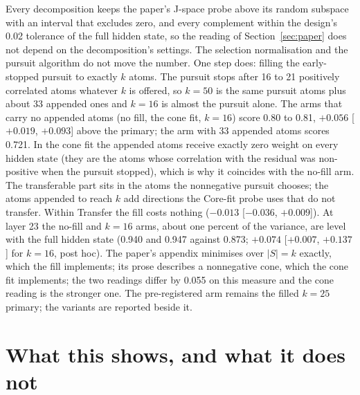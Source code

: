 \documentclass[11pt,a4paper]{article}
\begin{document}
Every decomposition keeps the paper's J-space probe above its random subspace with an interval that excludes zero, and every complement within the design's 0.02 tolerance of the full hidden state, so the reading of Section~\ref{sec:paper} does not depend on the decomposition's settings. The selection normalisation and the pursuit algorithm do not move the number. One step does: filling the early-stopped pursuit to exactly $k$ atoms. The pursuit stops after 16 to 21 positively correlated atoms whatever $k$ is offered, so $k=50$ is the same pursuit atoms plus about 33 appended ones and $k=16$ is almost the pursuit alone. The arms that carry no appended atoms (no fill, the cone fit, $k=16$) score 0.80 to 0.81, $+0.056$ [$+0.019$, $+0.093$] above the primary; the arm with 33 appended atoms scores 0.721. In the cone fit the appended atoms receive exactly zero weight on every hidden state (they are the atoms whose correlation with the residual was non-positive when the pursuit stopped), which is why it coincides with the no-fill arm. The transferable part sits in the atoms the nonnegative pursuit chooses; the atoms appended to reach $k$ add directions the Core-fit probe uses that do not transfer. Within Transfer the fill costs nothing ($-0.013$ [$-0.036$, $+0.009$]). At layer 23 the no-fill and $k=16$ arms, about one percent of the variance, are level with the full hidden state (0.940 and 0.947 against 0.873; $+0.074$ [$+0.007$, $+0.137$] for $k=16$, post hoc). The paper's appendix minimises over $|S|=k$ exactly, which the fill implements; its prose describes a nonnegative cone, which the cone fit implements; the two readings differ by 0.055 on this measure and the cone reading is the stronger one. The pre-registered arm remains the filled $k=25$ primary; the variants are reported beside it.

\section{What this shows, and what it does not}
\label{sec:scope}
\end{document}
